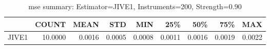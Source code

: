 \begin{table}[ht]
\centering
\caption{mse summary: Estimator=JIVE1, Instruments=200, Strength=0.90}
\begin{tabular}{lrrrrrrrr}
\toprule
 & COUNT & MEAN & STD & MIN & 25\% & 50\% & 75\% & MAX \\
\midrule
JIVE1 & 10.0000 & 0.0016 & 0.0005 & 0.0008 & 0.0011 & 0.0016 & 0.0019 & 0.0022 \\
\bottomrule
\end{tabular}
\end{table}

